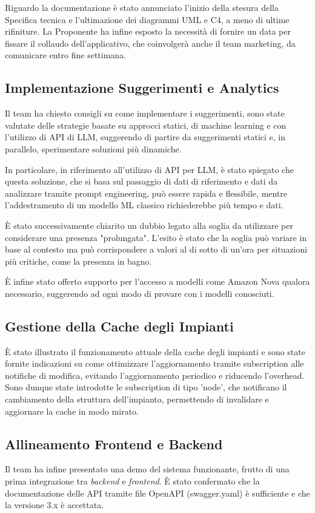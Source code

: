 \documentclass[10pt, letterpaper]{article}
\begin{document}
Riguardo la documentazione è stato annunciato l'inizio della stesura della
Specifica tecnica e l'ultimazione dei diagrammi UML e C4, a meno di ultime rifiniture.
La Proponente ha infine esposto la necessità di fornire un data per fissare il collaudo dell'applicativo, che coinvolgerà anche il team
marketing, da comunicare entro fine settimana.

\subsection*{Implementazione Suggerimenti e Analytics}
Il team ha chiesto consigli su come implementare i suggerimenti, sono state valutate delle strategie basate su  approcci statici, di machine learning e con l'utilizzo di API di LLM,
suggerendo di partire da suggerimenti statici e, in parallelo, sperimentare soluzioni più dinamiche.

In particolare, in riferimento all'utilizzo di API per LLM, è stato spiegato che questa soluzione, che si basa sul passaggio di dati di riferimento e dati da analizzare tramite prompt engineering, può essere rapida e flessibile, mentre l'addestramento di un modello ML classico richiederebbe più tempo e dati.

È stato successivamente chiarito un dubbio legato alla soglia da utilizzare per considerare una presenza "prolungata". L'esito è stato che la soglia può variare in base al contesto ma può corrispondere a valori al di sotto di un'ora per situazioni più critiche, come la presenza in bagno.

È infine stato offerto supporto per l'accesso a modelli come Amazon Nova qualora necessario, suggerendo ad ogni modo di provare con i modelli conosciuti.


\subsection*{Gestione della Cache degli Impianti}

È stato illustrato il funzionamento attuale della cache degli impianti e sono state fornite indicazioni su come ottimizzare l'aggiornamento tramite subscription alle notifiche di modifica, evitando l'aggiornamento periodico e riducendo l'overhead. Sono dunque state introdotte le subscription di tipo 'node',
che notificano il cambiamento della struttura dell'impianto, permettendo di invalidare e aggiornare la cache in modo mirato.

\subsection*{Allineamento Frontend e Backend}
Il team ha infine presentato una demo del sistema funzionante, frutto di una prima integrazione tra \textit{backend} e \textit{frontend}.
È stato confermato che la documentazione delle API tramite file OpenAPI (swagger.yaml) è sufficiente e che la versione 3.x è accettata. 
\end{document}
